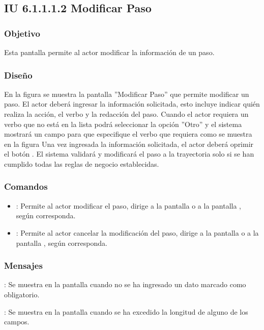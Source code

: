 \subsection{IU 6.1.1.1.2 Modificar Paso}

\subsubsection{Objetivo}
	Esta pantalla permite al actor modificar la información de un paso.
\subsubsection{Diseño}
	En la figura  se muestra la pantalla ''Modificar Paso'' que permite modificar un paso. El actor deberá ingresar la información solicitada, esto incluye indicar quién realiza la acción, el verbo y la redacción del paso.
	Cuando el actor requiera un verbo que no está en la lista podrá seleccionar la opción ''Otro'' y el sistema mostrará un campo para que especifique el verbo que requiera como se muestra en la figura 
	Una vez ingresada la información solicitada, el actor deberá oprimir el botón  . El sistema validará y modificará el paso a la trayectoria solo si se han cumplido todas las reglas de negocio establecidas.

\subsubsection{Comandos}
\begin{itemize}
	\item {}: Permite al actor modificar el paso, dirige a la pantalla  o a la pantalla , según corresponda.
	\item {}: Permite al actor cancelar la modificación del paso, dirige a la pantalla  o a la pantalla , según corresponda.
\end{itemize}

\subsubsection{Mensajes}

\begin{Citemize}
	\item {}: Se muestra en la pantalla  cuando no se ha ingresado un dato marcado como obligatorio.
	\item {}: Se muestra en la pantalla  cuando se ha excedido la longitud de alguno de los campos.
\end{Citemize}
